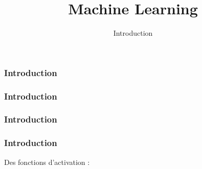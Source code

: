\documentclass{formation}
\title{Machine Learning}
\subtitle{Introduction}
\begin{document}
\maketitle

\begin{frame}
  \frametitle{Introduction}
\end{frame}

\begin{frame}
  \frametitle{Introduction}
\end{frame}

\begin{frame}
  \frametitle{Introduction}
\end{frame}

\begin{frame}
  \frametitle{Introduction}
  \begin{minipage}[c]{0.49\linewidth}
    Des fonctions d'activation :
  \end{minipage}\hfill
  \begin{minipage}[c]{0.50\linewidth}
  \end{minipage}\hfill
\end{frame}
\end{document}
